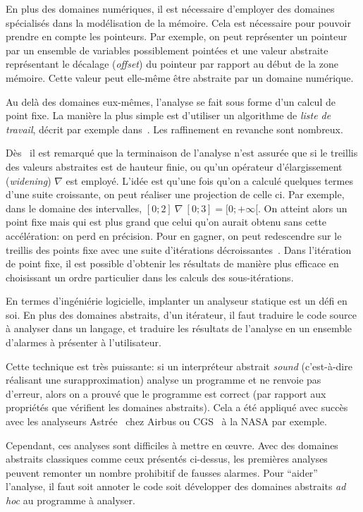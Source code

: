 En plus des domaines numériques, il est nécessaire d'employer des domaines
spécialisés dans la modélisation de la mémoire. Cela est nécessaire pour pouvoir
prendre en compte les pointeurs. Par exemple, on peut représenter un pointeur
par un ensemble de variables possiblement pointées et une valeur abstraite
représentant le décalage (\emph{offset}) du pointeur par rapport au début de la
zone mémoire. Cette valeur peut elle-même être abstraite par un domaine
numérique.

Au delà des domaines eux-mêmes, l'analyse se fait sous forme d'un calcul de
point fixe. La manière la plus simple est d'utiliser un algorithme de
\emph{liste de travail}, décrit par exemple dans~\cite{tapsoft95}. Les
raffinement en revanche sont nombreux.

Dès~\cite{Cousot77} il est remarqué que la terminaison de l'analyse n'est
assurée que si le treillis des valeurs abstraites est de hauteur finie, ou qu'un
opérateur d'élargissement (\emph{widening}) $\nabla$ est employé. L'idée est
qu'une fois qu'on a calculé quelques termes d'une suite croissante, on peut
réaliser une projection de celle ci. Par exemple, dans le domaine des
intervalles, $[0;2]~\nabla~[0;3] = [0;+\infty[$. On atteint alors un point fixe
mais qui est plus grand que celui qu'on aurait obtenu sans cette accélération:
on perd en précision. Pour en gagner, on peut redescendre sur le treillis des
points fixe avec une suite d'itérations décroissantes~\cite{granger}. Dans
l'itération de point fixe, il est possible d'obtenir les résultats de manière
plus efficace en choisissant un ordre particulier dans les calculs des
sous-itérations\cite{policy}.

En termes d'ingéniérie logicielle, implanter un analyseur statique est un défi
en soi. En plus des domaines abstraits, d'un itérateur, il faut traduire le code
source à analyser dans un langage, et traduire les résultats de l'analyse en un
ensemble d'alarmes à présenter à l'utilisateur.

Cette technique est très puissante: si un interpréteur abstrait \emph{sound}
(c'est-à-dire réalisant une surapproximation) analyse un programme et ne renvoie
pas d'erreur, alors on a prouvé que le programme est correct (par rapport aux
propriétés que vérifient les domaines abstraits). Cela a été appliqué avec
succès avec les analyseurs Astrée~\cite{Astree04,Astree05,AstreeScale} chez
Airbus ou CGS~\cite{cgs} à la NASA par exemple.

Cependant, ces analyses sont difficiles à mettre en œuvre. Avec des domaines
abstraits classiques comme ceux présentés ci-dessus, les premières analyses
peuvent remonter un nombre prohibitif de fausses alarmes. Pour ``aider''
l'analyse, il faut soit annoter le code soit développer des domaines abstraits
\emph{ad hoc} au programme à analyser.

